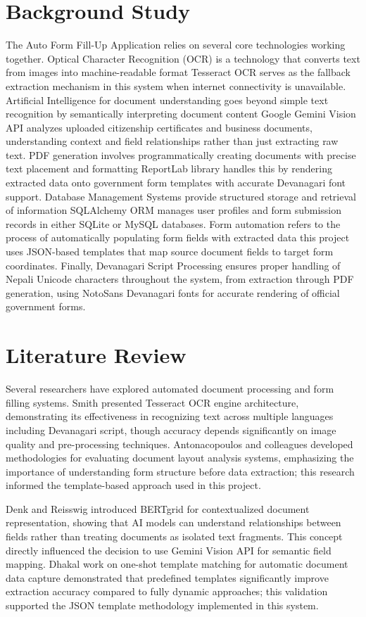 \documentclass[12pt]{report}
\begin{document}
\section{Background Study}
The Auto Form Fill-Up Application relies on several core technologies working 
together. Optical Character Recognition (OCR) is a technology that converts text from images into machine-readable format Tesseract OCR serves as the fallback extraction mechanism in this system when internet connectivity is unavailable. Artificial Intelligence for document understanding goes beyond simple text recognition by semantically interpreting document content Google Gemini Vision API analyzes uploaded citizenship certificates and business documents, understanding context and field relationships rather than just extracting raw text. PDF generation involves programmatically creating documents with precise text placement and formatting ReportLab library handles this by rendering extracted data onto government form templates with accurate Devanagari font support. Database Management Systems provide structured storage and retrieval of information SQLAlchemy ORM manages user profiles and form submission records in either SQLite or MySQL databases. Form automation refers to the process of automatically populating form fields with extracted data this project uses JSON-based templates that map source document fields to target form coordinates. Finally, Devanagari Script Processing ensures proper handling of Nepali Unicode characters throughout the system, from extraction through PDF generation, using NotoSans Devanagari fonts for accurate rendering of official government forms. 

\section{Literature Review}
Several researchers have explored automated document processing and form filling systems. Smith \cite{smith2007} presented Tesseract OCR engine architecture, demonstrating its effectiveness in recognizing text across multiple languages including Devanagari script, though accuracy depends significantly on image quality and pre-processing techniques. Antonacopoulos and colleagues \cite{antonacopoulos2003} developed methodologies for evaluating document layout analysis systems, emphasizing the importance of understanding form structure before data extraction; this research informed the template-based approach used in this project.

Denk and Reisswig \cite{denk2020} introduced BERTgrid for contextualized document representation, showing that AI models can understand relationships between fields rather than treating documents as isolated text fragments. This concept directly influenced the decision to use Gemini Vision API for semantic field mapping. Dhakal \cite{dhakal2019} work on one-shot template matching for automatic document data capture demonstrated that predefined templates significantly improve extraction accuracy compared to fully dynamic approaches; this validation supported the JSON template methodology implemented in this system.
\end{document}
